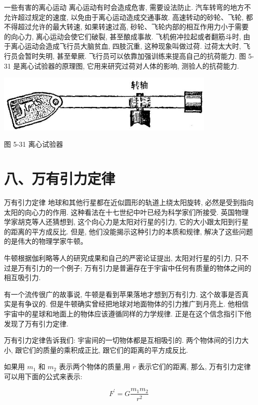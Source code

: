 \documentclass[10pt]{article}
\begin{document}
一些有害的离心运动 离心运动有时会造成危害, 需要设法防止. 汽车转弯的地方不允许超过规定的速度, 以免由于离心运动造成交通事故. 高速转动的砂轮、飞轮, 都不得超过允许的最大转速, 如果转速过高, 砂轮、飞轮内部的相互作用力小于需要的向心力, 离心运动会使它们破裂, 甚至酿成事故. 飞机俯冲拉起或者翻筋斗时, 由于离心运动会造成飞行员大脑贫血, 四肢沉重, 这种现象叫做过荷. 过荷太大时, 飞行员会暂时失明, 甚至晕厥. 飞行员可以依靠加强训练来提高自己的抗荷能力. 图 5-31 是离心试验器的原理图, 它用来研究过荷对人体的影响, 测验人的抗荷能力.

\begin{center}
\includegraphics[max width=0.8\textwidth]{images/01912d55-147c-70aa-b0e0-1782a122f948_154_835654.jpg}
\end{center}

图 5-31 离心试验器

\section*{八、万有引力定律}

万有引力定律 地球和其他行星都在近似圆形的轨道上绕太阳旋转, 必然是受到指向太阳的向心力的作用. 这种看法在十七世纪中叶已经为科学家们所接受. 英国物理学家胡克等人还猜想到, 这个向心力是太阳对行星的引力, 它的大小跟太阳到行星的距离的平方成反比. 但是, 他们没能揭示这种引力的本质和规律, 解决了这些问题的是伟大的物理学家牛顿。

牛顿根据伽利略等人的研究成果和自己的严密论证提出, 太阳对行星的引力, 只不过是万有引力的一个例子; 万有引力是普遍存在于宇宙中任何有质量的物体之间的相互吸引力.

有一个流传很广的故事说, 牛顿是看到苹果落地才想到万有引力. 这个故事是否真实是有争议的. 但是牛顿确实曾经把地球对地面物体的引力推广到月亮上. 他相信宇宙中的星球和地面上的物体应该遵循同样的力学规律. 正是在这个信念指引下他发现了万有引力定律.

万有引力定律告诉我们: 宇宙间的一切物体都是互相吸引的. 两个物体间的引力大小, 跟它们的质量的乘积成正比, 跟它们的距离的平方成反比.

如果用 \({m}_{1}\) 和 \({m}_{2}\) 表示两个物体的质量,用 \(r\) 表示它们的距离, 那么, 万有引力定律可以用下面的公式来表示:

\[
{F}^{\prime } = G\frac{{m}_{1}{m}_{2}}{{r}^{2}}
\]
\end{document}
